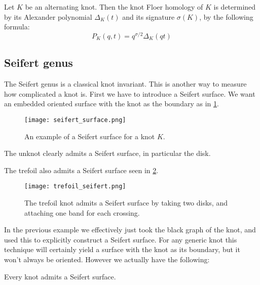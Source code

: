 \documentclass{amsproc}
\begin{document}
\begin{thm}
Let $K$ be an alternating knot. 
Then the knot Floer homology of $K$ is determined by its Alexander polynomial
$\Delta_K\left( t \right)$ and its signature $\sigma\left( K \right)$, by the following formula:
\begin{equation}
P_K\left( q , t \right) = q^{\sigma / 2} \Delta_K\left( qt \right)
\end{equation}
\end{thm}

\subsection{Seifert genus}

The Seifert genus is a classical knot invariant.
This is another way to measure how complicated a knot is.
First we have to introduce a Seifert surface.
We want an embedded oriented surface with the knot as the boundary as in \cref{fig:seifert_motivation}.

\begin{figure}
\texttt{[image: seifert\_surface.png]}
\caption{An example of a Seifert surface for a knot $K$.}
\label{fig:seifert_motivation}
\end{figure}

\begin{exm}
The unknot clearly admits a Seifert surface, in particular the disk.
\end{exm}

\begin{exm}
The trefoil also admits a Seifert surface seen in \cref{fig:trefoil_seifert}.
\begin{figure}
\texttt{[image: trefoil\_seifert.png]}
\caption{The trefoil knot admits a Seifert surface
by taking two disks, and attaching one band for each crossing.}
\label{fig:trefoil_seifert}
\end{figure}
\end{exm}

In the previous example we effectively just took the black graph of the knot, and used this
to explicitly construct a Seifert surface.
For any generic knot this technique will certainly yield a surface 
with the knot as its boundary, but it won't always be oriented. 
However we actually have the following:

\begin{thm}
Every knot admits a Seifert surface. 
\end{thm}
\end{document}
